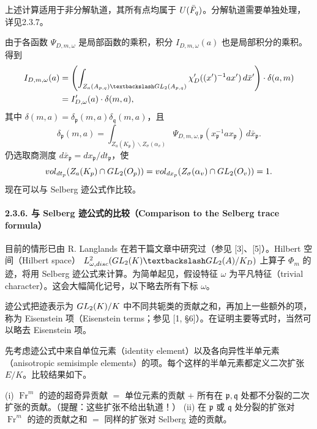 上述计算适用于非分解轨道，其所有点均属于 $U(\bar{F}_q)$。分解轨道需要单独处理，详见2.3.7。

由于各函数 $\Psi_{D,m,\omega}$ 是局部函数的乘积，积分 $I_{D,m,\omega}(a)$ 也是局部积分的乘积。得到
\begin{align*}
I_{D,m,\omega}(a)
&=\left(\int_{Z_a(A_{\mathfrak p,\mathfrak q})\backslash\GL_2(A_{\mathfrak p,\mathfrak q})}
\chi'_D((x')^{-1}ax')\,d\bar x'\right)\cdot\delta(a,m)\\
&=I'_{D,\omega}(a)\cdot\delta(m,a),
\end{align*}
其中 $\delta(m,a)=\delta_{\mathfrak p}(m,a)\delta_{\mathfrak q}(m,a)$，且
\[
\delta_{\mathfrak p}(m,a)=
\int_{Z_a(K_{\mathfrak p})\backslash Z_\sigma(\alpha_v)}
\Psi_{D,m,\omega,\mathfrak p}(x_{\mathfrak p}^{-1}ax_{\mathfrak p})\,d\bar x_{\mathfrak p}.
\]
仍选取商测度 $d\bar x_{\mathfrak p}=dx_{\mathfrak p}/dt_{\mathfrak p}$，使
\[
vol_{dt_{p}}(Z_a(K_{p})\cap GL_2(O_{p}))
=vol_{dx_{p}}(Z_\sigma(\alpha_v)\cap GL_2(O_v))=1.
\]
现在可以与 Selberg 迹公式作比较。
\paragraph*{2.3.6. 与 Selberg 迹公式的比较（Comparison to the Selberg trace formula）}
目前的情形已由 R. Langlands 在若干篇文章中研究过（参见 [3]、[5]）。Hilbert 空间（Hilbert space）
$L^2_{\omega,\mathrm{disc}}(\GL_2(K)\backslash\GL_2(A)/\mathcal K_D)$
上算子 $\Phi_m$ 的迹，将用 Selberg 迹公式来计算。为简单起见，假设特征 $\omega$ 为平凡特征（trivial character）。这会大幅简化记号，以下略去所有下标 $\omega$。

迹公式把迹表示为 $GL_2(K)/K$ 中不同共轭类的贡献之和，再加上一些额外的项，称为 Eisenstein 项（Eisenstein terms；参见 [1, §6]）。在证明主要等式时，当然可以略去 Eisenstein 项。

先考虑迹公式中来自单位元素（identity element）以及各向异性半单元素（anisotropic semisimple elements）的项。每个这样的半单元素都定义二次扩张 $E/K$。比较结果如下。

(i) $\operatorname{Fr}^m$ 的迹的超奇异贡献 $=$ 单位元素的贡献 $+$ 所有在 $\mathfrak p,\mathfrak q$ 处都不分裂的二次扩张的贡献。（提醒：这些扩张不给出轨道！）
(ii) 在 $\mathfrak p$ 或 $\mathfrak q$ 处分裂的扩张对
$\operatorname{Fr}^m$ 的迹的贡献之和 $=$ 同样的扩张对 Selberg 迹的贡献。

